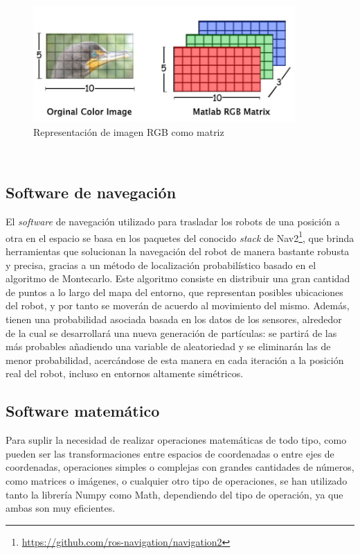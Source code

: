 \begin{figure} [h!]
  \begin{center}
    \includegraphics[width=10cm]{figs/rgb_matrix}
  \end{center}
  \caption{Representación de imagen RGB como matriz \cite{rgb_mat}}
  \label{fig:rgb_mat}
\end{figure}\


\subsection{Software de navegación}
\label{sec:navegacion}

El \textit{software} de navegación utilizado para trasladar los robots de una
posición a otra en el espacio se basa en los paquetes del conocido
\textit{stack} de Nav2\footnote{
\href{https://github.com/ros-navigation/navigation2}{https://github.com/ros-navigation/navigation2}},
que brinda herramientas que solucionan la navegación del robot de manera
bastante robusta y precisa, gracias a un método de localización probabilístico
basado en el algoritmo de Montecarlo.
Este algoritmo consiste en distribuir una gran cantidad de puntos a lo largo del
mapa del entorno, que representan posibles ubicaciones del robot, y por tanto se
moverán de acuerdo al movimiento del mismo.
Además, tienen una probabilidad asociada basada en los datos de los sensores,
alrededor de la cual se desarrollará una nueva generación de partículas: se
partirá de las más probables añadiendo una variable de aleatoriedad y se
eliminarán las de menor probabilidad, acercándose de esta manera en cada
iteración a la posición real del robot, incluso en entornos altamente
simétricos.
\\


\subsection{Software matemático}
\label{sec:software_matematico}

Para suplir la necesidad de realizar operaciones matemáticas de todo tipo, como
pueden ser las transformaciones entre espacios de coordenadas o entre ejes de
coordenadas, operaciones simples o complejas con grandes cantidades de números,
como matrices o imágenes, o cualquier otro tipo de operaciones, se han utilizado
tanto la librería Numpy como Math, dependiendo del tipo de operación, ya que
ambas son muy eficientes.
\\

